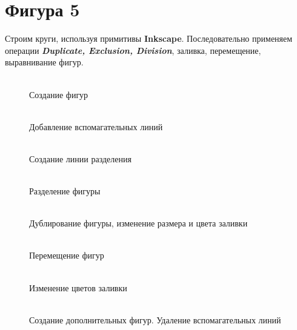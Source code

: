 \newpage
\section[Фигура 5]{Фигура 5}

Строим круги, используя примитивы \textbf{Inkscape}.
Последовательно применяем операции
\textit{\textbf{Duplicate, Exclusion, Division}}, заливка, перемещение, выравнивание фигур.

\begin{figure}[H]
    \begin{minipage}[h]{0.47\linewidth}
        \\
        Создание фигур
    \end{minipage}
    \hfill
    \begin{minipage}[h]{0.47\linewidth}
        \\
        Добавление вспомагательных линий
    \end{minipage}
    \vfill
    \vspace*{1cm}
    \begin{minipage}[h]{0.47\linewidth}
        \\
        Создание линии разделения
    \end{minipage}
    \hfill
    \begin{minipage}[h]{0.47\linewidth}
        \\
        Разделение фигуры
    \end{minipage}
\end{figure}
\newpage
\begin{figure}[H]
    \begin{minipage}[h]{0.47\linewidth}
        \\
        Дублирование фигуры, изменение размера и цвета заливки
    \end{minipage}
    \hfill
    \begin{minipage}[h]{0.47\linewidth}
        \\
        Перемещение фигур
    \end{minipage}
    \vspace*{1cm}
    \vfill
    \begin{minipage}[h]{0.47\linewidth}
        \\
        Изменение цветов заливки
    \end{minipage}
    \hfill
    \begin{minipage}[h]{0.47\linewidth}
        \\
        Создание дополнительных фигур. Удаление вспомагательных линий
    \end{minipage}
\end{figure}
